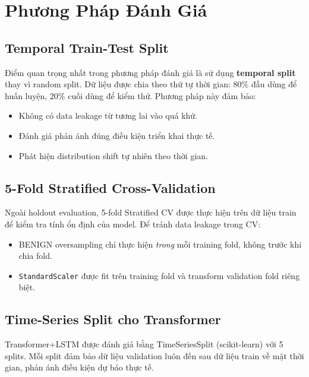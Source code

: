 \documentclass[12pt,a4paper]{article}
\begin{document}
\section{Phương Pháp Đánh Giá}

\subsection{Temporal Train-Test Split}

Điểm quan trọng nhất trong phương pháp đánh giá là sử dụng \textbf{temporal split} thay vì random split. Dữ liệu được chia theo thứ tự thời gian: 80\% đầu dùng để huấn luyện, 20\% cuối dùng để kiểm thử. Phương pháp này đảm bảo:

\begin{itemize}[leftmargin=2em]
\item Không có data leakage từ tương lai vào quá khứ.
\item Đánh giá phản ánh đúng điều kiện triển khai thực tế.
\item Phát hiện distribution shift tự nhiên theo thời gian.
\end{itemize}

\subsection{5-Fold Stratified Cross-Validation}

Ngoài holdout evaluation, 5-fold Stratified CV được thực hiện trên dữ liệu train để kiểm tra tính ổn định của model. Để tránh data leakage trong CV:

\begin{itemize}[leftmargin=2em]
\item BENIGN oversampling chỉ thực hiện \textit{trong} mỗi training fold, không trước khi chia fold.
\item \texttt{StandardScaler} được fit trên training fold và transform validation fold riêng biệt.
\end{itemize}

\subsection{Time-Series Split cho Transformer}

Transformer+LSTM được đánh giá bằng TimeSeriesSplit (scikit-learn) với 5 splits. Mỗi split đảm bảo dữ liệu validation luôn đến sau dữ liệu train về mặt thời gian, phản ánh điều kiện dự báo thực tế.
\end{document}
